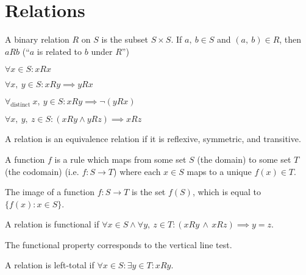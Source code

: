 \documentclass{article}
\begin{document}
\section{Relations}
\begin{definition}
    A binary relation \(R\) on \(S\) is the subset \(S\times S\).
    If \(a, \: b \in S\) and  \((a, \: b) \in R\),
    then \(aRb\) (``\(a\) is related to \(b\) under \(R\)'')
\end{definition}
%
\begin{tcolorboxlarge}[title={Relation Properties}]
    \begin{description}[style=sameline]
        \item[Reflexive]
            \(\forall x \in S : xRx\)
        \item[Symmetric]
            \(\forall x,\: y \in S : xRy \implies yRx\)
        \item[Antisymmetric]
            \(\forall_\text{distinct} \: x,\: y \in S : xRy \implies \neg (yRx)\)
        \item[Transitive]
            \(\forall x,\: y, \: z \in S : (xRy \land yRz) \implies xRz\)
    \end{description}
    \begin{definition}
        A relation is an equivalence relation if it is
        reflexive, symmetric, and transitive.
    \end{definition}
\end{tcolorboxlarge}
%
\begin{definition}
    A function \(f\) is a rule which maps
    from some set \(S\) (the domain)
    to some set \(T\) (the codomain)
    (i.e. \(f: S \to T\)) where each \(x \in S\) maps to a unique \(f(x) \in T\).
\end{definition}
\begin{definition}[Image]
    The image of a function \(f: S \to T\) is the set \(f(S)\),
    which is equal to \(\{f(x):x \in S\}\).
\end{definition}
\begin{definition}[Functional]
    A relation is functional if
    \(\forall x \in S \land \forall y,\: z \in T
        : (xRy \, \land \, xRz) \implies y=z\).
\end{definition}
\begin{note}
    The functional property corresponds to the vertical line test.
\end{note}
\begin{definition}
    A relation is left-total if
    \(\forall x \in S : \exists y \in T : xRy\).
\end{definition}
\end{document}
